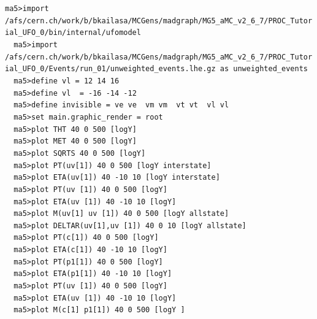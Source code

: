 \documentclass[a4paper, 10pt]{article}
\begin{document}
\texttt{ma5>import /\-afs/\-cern.ch/\-work/\-b/\-bkailasa/\-MCGens/\-madgraph/\-MG5\_aMC\_v2\_6\_7/\-PROC\_Tutorial\_UFO\_0/\-bin/\-internal/\-ufomodel\\
}
\texttt{ }\texttt{ }\texttt{ma5>import /\-afs/\-cern.ch/\-work/\-b/\-bkailasa/\-MCGens/\-madgraph/\-MG5\_aMC\_v2\_6\_7/\-PROC\_Tutorial\_UFO\_0/\-Events/\-run\_01/\-unweighted\_events.lhe.gz as unweighted\_events\\
}
\texttt{ }\texttt{ }\texttt{ma5>define vl = 12 14 16\\
}
\texttt{ }\texttt{ }\texttt{ma5>define vl~ = -16 -14 -12\\
}
\texttt{ }\texttt{ }\texttt{ma5>define invisible = ve ve~ vm vm~ vt vt~ vl vl~\\
}
\texttt{ }\texttt{ }\texttt{ma5>set main.graphic\_render = root\\
}
\texttt{ }\texttt{ }\texttt{ma5>plot THT   40 0 500 [logY]\\
}
\texttt{ }\texttt{ }\texttt{ma5>plot MET   40 0 500 [logY]\\
}
\texttt{ }\texttt{ }\texttt{ma5>plot SQRTS 40 0 500 [logY]\\
}
\texttt{ }\texttt{ }\texttt{ma5>plot  PT(uv[1]) 40 0  500 [logY interstate]\\
}
\texttt{ }\texttt{ }\texttt{ma5>plot ETA(uv[1]) 40 -10 10 [logY interstate]\\
}
\texttt{ }\texttt{ }\texttt{ma5>plot  PT(uv~[1]) 40 0  500 [logY]\\
}
\texttt{ }\texttt{ }\texttt{ma5>plot ETA(uv~[1]) 40 -10 10 [logY]\\
}
\texttt{ }\texttt{ }\texttt{ma5>plot M(uv[1] uv~[1]) 40 0  500 [logY allstate]\\
}
\texttt{ }\texttt{ }\texttt{ma5>plot DELTAR(uv[1],uv~[1]) 40 0 10 [logY allstate]\\
}
\texttt{ }\texttt{ }\texttt{ma5>plot  PT(c[1]) 40 0  500 [logY]\\
}
\texttt{ }\texttt{ }\texttt{ma5>plot ETA(c[1]) 40 -10 10 [logY]\\
}
\texttt{ }\texttt{ }\texttt{ma5>plot  PT(p1[1]) 40 0  500 [logY]\\
}
\texttt{ }\texttt{ }\texttt{ma5>plot ETA(p1[1]) 40 -10 10 [logY]\\
}
\texttt{ }\texttt{ }\texttt{ma5>plot  PT(uv~[1]) 40 0  500 [logY]\\
}
\texttt{ }\texttt{ }\texttt{ma5>plot ETA(uv~[1]) 40 -10 10 [logY]\\
}
\texttt{ }\texttt{ }\texttt{ma5>plot M(c[1] p1[1]) 40 0  500 [logY ]\\
}
\end{document}
